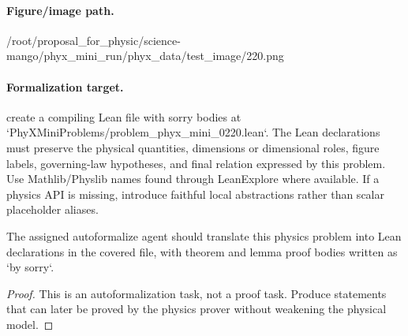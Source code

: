 \paragraph{Figure/image path.}
/root/proposal\_for\_physic/science-mango/phyx\_mini\_run/phyx\_data/test\_image/220.png

\paragraph{Formalization target.}
create a compiling Lean file with sorry bodies at `PhyXMiniProblems/problem\_phyx\_mini\_0220.lean`. The Lean declarations must preserve the physical quantities, dimensions or dimensional roles, figure labels, governing-law hypotheses, and final relation expressed by this problem.
Use Mathlib/Physlib names found through LeanExplore where available. If a physics API is missing, introduce faithful local abstractions rather than scalar placeholder aliases.

\begin{theorem}
\label{thm:physics:phyx_mini_0220:target}
The assigned autoformalize agent should translate this physics problem into Lean declarations in the covered file, with theorem and lemma proof bodies written as `by sorry`.
\end{theorem}
\begin{proof}
This is an autoformalization task, not a proof task. Produce statements that can later be proved by the physics prover without weakening the physical model.
\end{proof}

